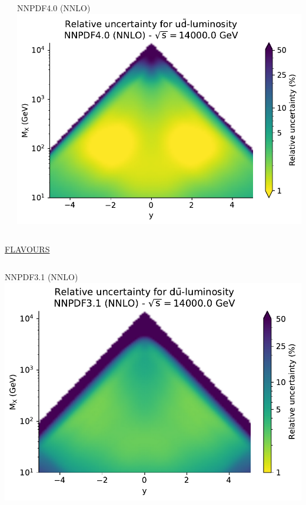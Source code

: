 \documentclass{beamer}
\begin{document}
\begin{frame}
\begin{overlayarea}{\textwidth}{5.2cm}
{\begin{columns}[c]
\begin{column}{0.5\textwidth}
   \end{column}
   \begin{column}{0.5\textwidth}
    \centering
        NNPDF4.0 (NNLO)\\
        \vspace{0.1cm}
        \includegraphics[width=\columnwidth]{plots/plot_lumi2d_uncertainty_NNPDF40_udbar}\\    
   \end{column}
  \end{columns}  
  } 
  {
  \centering
  \underline{FLAVOURS}\\
  \begin{columns}[c]
   \begin{column}{0.5\textwidth}
    \centering
        NNPDF3.1 (NNLO)\\
        \vspace{0.1cm}
        \includegraphics[width=\columnwidth]{plots/plot_lumi2d_uncertainty_NNPDF31_dubar}\\

\end{column}
\end{columns}}
\end{overlayarea}
\end{frame}
\end{document}
